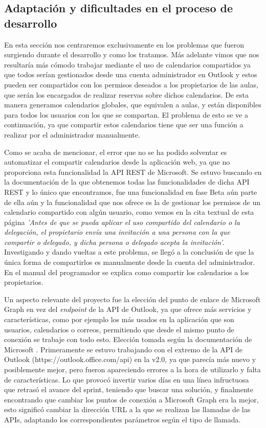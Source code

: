 \subsection{Adaptación y dificultades en el proceso de desarrollo}
En esta sección nos centraremos exclusivamente en los problemas que fueron surgiendo durante el desarrollo y como los tratamos.\newline
Más adelante vimos que nos resultaría más cómodo trabajar mediante el uso de calendarios compartidos ya que todos serían gestionados desde una cuenta administrador en Outlook y estos pueden ser compartidos con los permisos deseados a los propietarios de las aulas, que serán los encargados de realizar reservas sobre dichos calendarios. De esta manera generamos calendarios globales, que equivalen a aulas, y están disponibles para todos los usuarios con los que se compartan. El problema de esto se ve a continuación, ya que compartir estos calendarios tiene que ser una función a realizar por el administrador manualmente.\newline

Como se acaba de mencionar, el error que no se ha podido solventar es automatizar el compartir calendarios desde la aplicación web, ya que no proporciona esta funcionalidad la API REST de Microsoft. Se estuvo buscando en la documentación de la que obtenemos todas las funcionalidades de dicha API REST y lo único que encontramos, fue una funcionalidad en fase Beta aún parte de ella aún y la funcionalidad que nos ofrece es la de gestionar los permisos de un calendario compartido con algún usuario, como vemos en la cita textual de esta página \textit{'Antes de que se pueda aplicar el uso compartido del calendario o la delegación, el propietario envía una invitación a una persona con la que compartir o delegado, y dicha persona o delegado acepta la invitación'}\cite{compartirCalendario}. Investigando y dando vueltas a este problema, se llegó a la conclusión de que la única forma de compartirlos es manualmente desde la cuenta del administrador. En el manual del programador se explica como compartir los calendarios a los propietarios.\newline 

Un aspecto relevante del proyecto fue la elección del punto de enlace de Microsoft Graph en vez del \textit{endpoint} de la API de Outlook, ya que ofrece más servicios y características, como por ejemplo los más usados en la aplicación que son usuarios, calendarios o correos, permitiendo que desde el mismo punto de conexión se trabaje con todo esto. Elección tomada según la documentación de Microsoft \cite{microsoftGraphCompare}. Primeramente se estuvo trabajando con el extremo de la API de Outlook (https://outlook.office.com/api) en la v2.0, ya que parecía más nuevo y posiblemente mejor, pero fueron apareciendo errores a la hora de utilizarlo y falta de características. Lo que provocó invertir varios días en una línea infructuosa que retrasó el avance del sprint, teniendo que buscar una solución, y finalmente encontrando que cambiar los puntos de conexión a Microsoft Graph era la mejor, esto significó cambiar la dirección URL a la que se realizan las llamadas de las APIs, adaptando los correspondientes parámetros según el tipo de llamada.\newline

